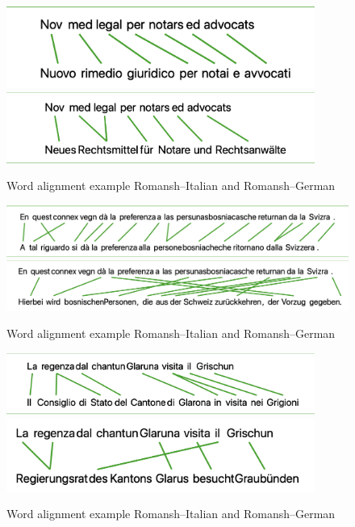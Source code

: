 \begin{figure}
	\includegraphics[width=0.9\textwidth]{graphics/alignments/it/nov-med-it.png}
	\includegraphics[width=0.9\textwidth]{graphics/alignments/it/nov-med-de.png}
	\caption{Word alignment example Romansh--Italian and Romansh--German}
	\label{fig:nov-med}
\end{figure}


\begin{figure}
	\includegraphics[width=1.1\textwidth]{graphics/alignments/it/connex-it.png}
	\includegraphics[width=1.1\textwidth]{graphics/alignments/it/connex-de.png}
	\caption{Word alignment example Romansh--Italian and Romansh--German}
	\label{fig:connex}
\end{figure}

\begin{figure}
	\includegraphics[width=0.9\textwidth]{graphics/alignments/it/regenza-it.png}
	\includegraphics[width=0.9\textwidth]{graphics/alignments/it/regenza-de.png}
	\caption{Word alignment example Romansh--Italian and Romansh--German}
	\label{fig:regenza}
\end{figure}


